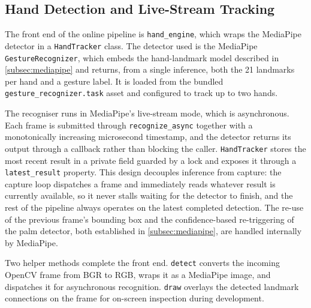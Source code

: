 \subsection{Hand Detection and Live-Stream Tracking}\label{subsec:hand_tracking}

The front end of the online pipeline is \texttt{hand\_engine}, which wraps the
MediaPipe detector in a \texttt{HandTracker} class. The detector used is the
MediaPipe \texttt{GestureRecognizer}, which embeds the hand-landmark model
described in \autoref{subsec:mediapipe} and returns, from a single inference, both
the 21 landmarks per hand and a gesture label. It is loaded from the bundled
\texttt{gesture\_recognizer.task} asset and configured to track up to two hands.

The recogniser runs in MediaPipe's live-stream mode, which is asynchronous. Each
frame is submitted through \texttt{recognize\_async} together with a
monotonically increasing microsecond timestamp, and the detector returns its
output through a callback rather than blocking the caller. \texttt{HandTracker}
stores the most recent result in a private field guarded by a lock and exposes it
through a \texttt{latest\_result} property. This design decouples inference from
capture: the capture loop dispatches a frame and immediately reads whatever result
is currently available, so it never stalls waiting for the detector to finish, and
the rest of the pipeline always operates on the latest completed detection. The
re-use of the previous frame's bounding box and the confidence-based
re-triggering of the palm detector, both established in \autoref{subsec:mediapipe},
are handled internally by MediaPipe.

Two helper methods complete the front end. \texttt{detect} converts the incoming
OpenCV frame from BGR to RGB, wraps it as a MediaPipe image, and dispatches it for
asynchronous recognition. \texttt{draw} overlays the detected landmark
connections on the frame for on-screen inspection during development.
